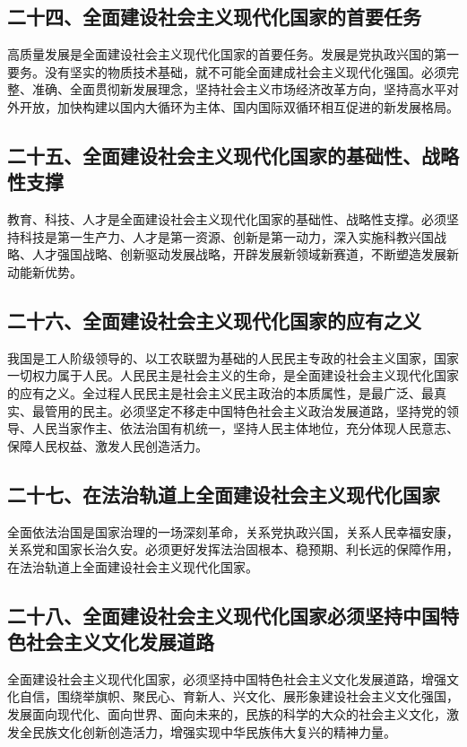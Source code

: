 \documentclass[UTF8,11pt,a4paper]{ctexart}
\begin{document}
\subsection*{二十四、全面建设社会主义现代化国家的首要任务}

高质量发展是全面建设社会主义现代化国家的首要任务。发展是党执政兴国的第一要务。没有坚实的物质技术基础，就不可能全面建成社会主义现代化强国。必须完整、准确、全面贯彻新发展理念，坚持社会主义市场经济改革方向，坚持高水平对外开放，加快构建以国内大循环为主体、国内国际双循环相互促进的新发展格局。

\subsection*{二十五、全面建设社会主义现代化国家的基础性、战略性支撑}

教育、科技、人才是全面建设社会主义现代化国家的基础性、战略性支撑。必须坚持科技是第一生产力、人才是第一资源、创新是第一动力，深入实施科教兴国战略、人才强国战略、创新驱动发展战略，开辟发展新领域新赛道，不断塑造发展新动能新优势。

\subsection*{二十六、全面建设社会主义现代化国家的应有之义}

我国是工人阶级领导的、以工农联盟为基础的人民民主专政的社会主义国家，国家一切权力属于人民。人民民主是社会主义的生命，是全面建设社会主义现代化国家的应有之义。全过程人民民主是社会主义民主政治的本质属性，是最广泛、最真实、最管用的民主。必须坚定不移走中国特色社会主义政治发展道路，坚持党的领导、人民当家作主、依法治国有机统一，坚持人民主体地位，充分体现人民意志、保障人民权益、激发人民创造活力。

\subsection*{二十七、在法治轨道上全面建设社会主义现代化国家}

全面依法治国是国家治理的一场深刻革命，关系党执政兴国，关系人民幸福安康，关系党和国家长治久安。必须更好发挥法治固根本、稳预期、利长远的保障作用，在法治轨道上全面建设社会主义现代化国家。

\subsection*{二十八、全面建设社会主义现代化国家必须坚持中国特色社会主义文化发展道路}

全面建设社会主义现代化国家，必须坚持中国特色社会主义文化发展道路，增强文化自信，围绕举旗帜、聚民心、育新人、兴文化、展形象建设社会主义文化强国，发展面向现代化、面向世界、面向未来的，民族的科学的大众的社会主义文化，激发全民族文化创新创造活力，增强实现中华民族伟大复兴的精神力量。
\end{document}
